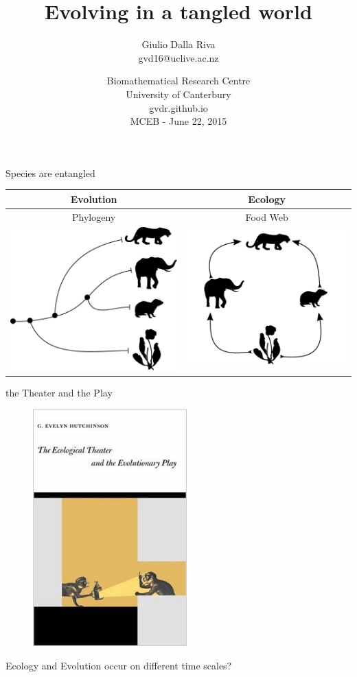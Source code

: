 \documentclass[]{beamer}
\title{Evolving in a tangled world}
\author{Giulio Dalla Riva\\
\tiny{gvd16@uclive.ac.nz}\\
}
\date{  {\tiny Biomathematical Research Centre\\
  University of Canterbury\\
     gvdr.github.io\\
     \vskip 0.5cm
  }
MCEB - June 22, 2015}
\begin{document}
\frame{\titlepage
\addtocounter{framenumber}{-1}}

\begin{frame}{Species are entangled}

\centering
\begin{tabular}{|c|c|}\hline
Evolution & Ecology \\\hline\hline
Phylogeny & Food Web \\
\includegraphics[width=0.4 \textwidth]{images/small_phylo.pdf} & \includegraphics[width=0.4 \textwidth]{images/small_fw.pdf} \\ \hline
\end{tabular}

\end{frame}

\begin{frame}{the Theater and the Play}

\begin{figure}
\centering
\includegraphics[height=0.5 \textheight]{images/hutchinson_ecotheatreevoplay.jpg}
\end{figure}
\centering
{\tiny Ecology and Evolution occur on different time scales?}

\end{frame}
\end{document}
